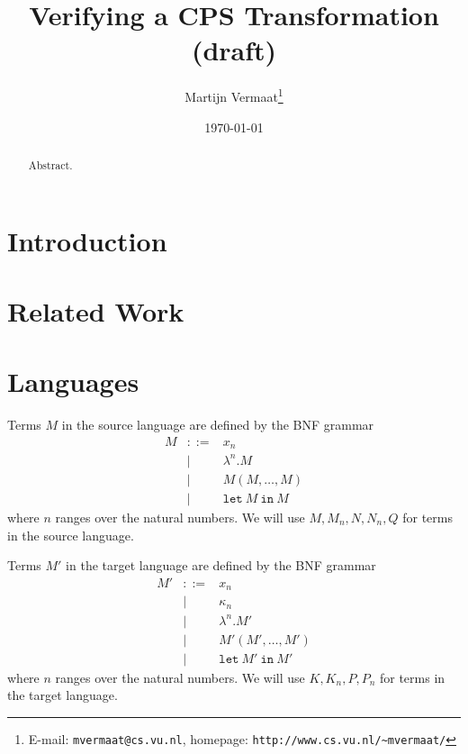 \documentclass[a4paper,11pt]{article}
\title{Verifying a CPS Transformation (draft)}
\author{Martijn Vermaat\footnote{E-mail: \texttt{mvermaat@cs.vu.nl},
    homepage: \texttt{http://www.cs.vu.nl/\~{}mvermaat/}}}
\date{\today}
\begin{document}
\maketitle


\begin{abstract}
  Abstract.
\end{abstract}


\section{Introduction}\label{sec:introduction}


\section{Related Work}\label{sec:related}


\section{Languages}\label{sec:languages}

Terms $M$ in the source language are defined by the BNF grammar
\begin{eqnarray*}
M & ::= & x_{n} \\
  &   | & \lambda^{n}.M \\
  &   | & M(M, \ldots, M) \\
  &   | & \texttt{let} \: M \: \texttt{in} \: M
\end{eqnarray*}
where $n$ ranges over the natural numbers.
We will use $M, M_{n}, N, N_{n}, Q$ for terms in the source language.


Terms $M'$ in the target language are defined by the BNF grammar
\begin{eqnarray*}
M' & ::= & x_{n} \\
   &   | & \kappa_{n} \\
   &   | & \lambda^{n}.M' \\
   &   | & M'(M', \ldots, M') \\
   &   | & \texttt{let} \: M' \: \texttt{in} \: M'
\end{eqnarray*}
where $n$ ranges over the natural numbers.
We will use $K, K_{n}, P, P_{n}$ for terms in the target language.


\end{document}
